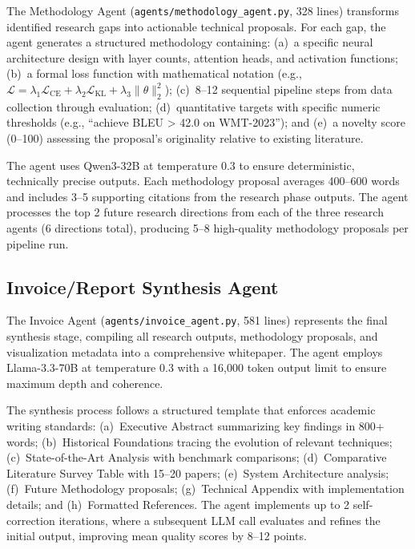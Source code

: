 \documentclass[a4paper,12pt,openany]{report}
\begin{document}
The Methodology Agent (\texttt{agents/methodology\_agent.py}, 328 lines) transforms identified research gaps into actionable technical proposals. For each gap, the agent generates a structured methodology containing: (a)~a specific neural architecture design with layer counts, attention heads, and activation functions; (b)~a formal loss function with mathematical notation (e.g., $\mathcal{L} = \lambda_1 \mathcal{L}_{\text{CE}} + \lambda_2 \mathcal{L}_{\text{KL}} + \lambda_3 \|\theta\|_2^2$); (c)~8--12 sequential pipeline steps from data collection through evaluation; (d)~quantitative targets with specific numeric thresholds (e.g., ``achieve BLEU > 42.0 on WMT-2023''); and (e)~a novelty score (0--100) assessing the proposal's originality relative to existing literature.

The agent uses Qwen3-32B at temperature 0.3 to ensure deterministic, technically precise outputs. Each methodology proposal averages 400--600 words and includes 3--5 supporting citations from the research phase outputs. The agent processes the top 2 future research directions from each of the three research agents (6 directions total), producing 5--8 high-quality methodology proposals per pipeline run.

\subsection{Invoice/Report Synthesis Agent}

The Invoice Agent (\texttt{agents/invoice\_agent.py}, 581 lines) represents the final synthesis stage, compiling all research outputs, methodology proposals, and visualization metadata into a comprehensive whitepaper. The agent employs Llama-3.3-70B at temperature 0.3 with a 16,000 token output limit to ensure maximum depth and coherence.

The synthesis process follows a structured template that enforces academic writing standards: (a)~Executive Abstract summarizing key findings in 800+ words; (b)~Historical Foundations tracing the evolution of relevant techniques; (c)~State-of-the-Art Analysis with benchmark comparisons; (d)~Comparative Literature Survey Table with 15--20 papers; (e)~System Architecture analysis; (f)~Future Methodology proposals; (g)~Technical Appendix with implementation details; and (h)~Formatted References. The agent implements up to 2 self-correction iterations, where a subsequent LLM call evaluates and refines the initial output, improving mean quality scores by 8--12 points.
\end{document}
